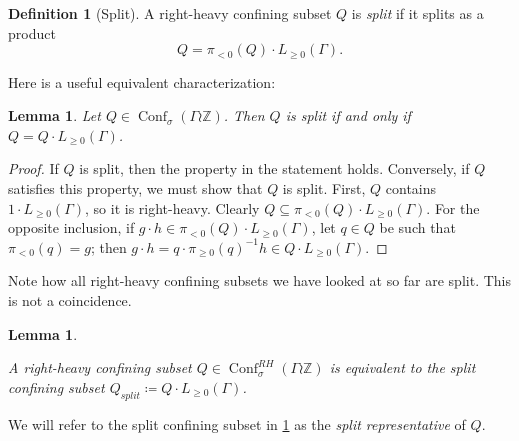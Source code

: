 \documentclass[reqno,12pt]{amsart}\setcounter{tocdepth}{1}
\newtheorem{lemma}[theorem]{Lemma}
\theoremstyle{definition}
\newtheorem{definition}[theorem]{Definition}
\newcommand{\Z}{\mathbb{Z}}
\DeclareMathOperator{\Conf}{Conf}
\numberwithin{equation}{section}
\begin{document}
\begin{definition}[Split]
\label{def:splitreps:lamplighters}
A right-heavy confining subset $Q$ is \emph{split} if it splits as a product
\[Q = \pi_{<0}(Q) \cdot L_{\geq 0}(\Gamma).\]
\end{definition}

Here is a useful equivalent characterization:

\begin{lemma}
\label{lem:splitreps:char:lamplighters}
Let $Q \in \Conf_{\sigma}(\Gamma \wr \Z)$. Then $Q$ is split if and only if $Q = Q \cdot L_{\geq 0}(\Gamma)$.
\end{lemma}

\begin{proof}
If $Q$ is split, then the property in the statement holds. Conversely, if $Q$ satisfies this property, we must show that $Q$ is split. First, $Q$ contains $1 \cdot L_{\geq 0}(\Gamma)$, so it is right-heavy. Clearly $Q \subseteq \pi_{<0}(Q) \cdot L_{\geq 0}(\Gamma)$. For the opposite inclusion, if $g \cdot h \in \pi_{<0}(Q) \cdot L_{\geq 0}(\Gamma)$, let $q \in Q$ be such that $\pi_{<0}(q) = g$; then $g \cdot h = q \cdot \pi_{\geq 0}(q)^{-1} h \in Q \cdot L_{\geq 0}(\Gamma)$.
\end{proof}

Note how all right-heavy confining subsets we have looked at so far are split. This is not a coincidence.

\begin{lemma}
\label{lem:splitreps:lamplighters}

A right-heavy confining subset $Q \in \Conf_\sigma^{RH}(\Gamma \wr \Z)$ is equivalent to the split confining subset $Q_{split} \coloneqq Q \cdot L_{\geq 0}(\Gamma)$.
\end{lemma}

We will refer to the split confining subset in \cref{lem:splitreps:lamplighters} as the \emph{split representative} of $Q$.
\end{document}
